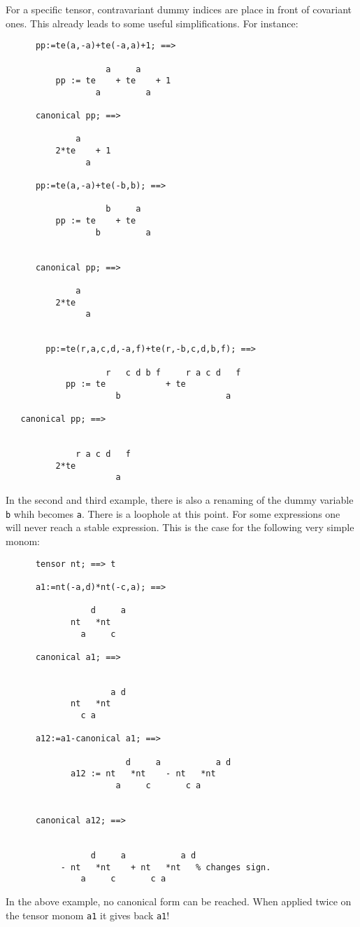 For a specific tensor, contravariant dummy indices are place
in front of covariant ones. This already leads to some useful
simplifications. For instance:
\begin{verbatim}
      pp:=te(a,-a)+te(-a,a)+1; ==>

                    a     a
          pp := te    + te    + 1
                  a         a

      canonical pp; ==>

              a
          2*te    + 1
                a

      pp:=te(a,-a)+te(-b,b); ==>

                    b     a
          pp := te    + te
                  b         a


      canonical pp; ==>

              a
          2*te
                a


        pp:=te(r,a,c,d,-a,f)+te(r,-b,c,d,b,f); ==>

                    r   c d b f     r a c d   f
            pp := te            + te
                      b                     a

   canonical pp; ==>


              r a c d   f
          2*te
                      a
\end{verbatim}
In the second and third example, there is also a renaming of the
dummy variable \texttt{b} whih becomes \texttt{a}.
There is a loophole at this point. For some expressions one will
never reach a stable expression.
This is the case for the following very simple monom:
\begin{verbatim}
      tensor nt; ==> t

      a1:=nt(-a,d)*nt(-c,a); ==>

                 d     a
             nt   *nt
               a     c

      canonical a1; ==>


                     a d
             nt   *nt
               c a

      a12:=a1-canonical a1; ==>

                        d     a           a d
             a12 := nt   *nt    - nt   *nt
                      a     c       c a


      canonical a12; ==>


                 d     a           a d
           - nt   *nt    + nt   *nt   % changes sign.
               a     c       c a
\end{verbatim}
In the above example, no canonical form can be reached. When applied twice
on the tensor monom \texttt{a1} it gives back \texttt{a1}!

